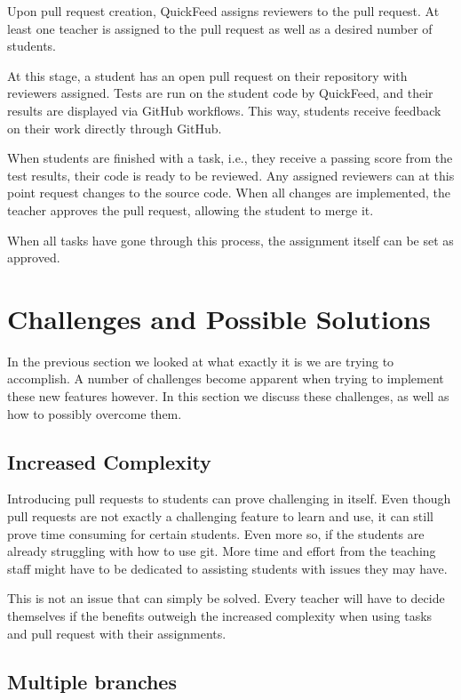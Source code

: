 Upon pull request creation, QuickFeed assigns reviewers to the pull request.
At least one teacher is assigned to the pull request as well as a desired number of students.

At this stage, a student has an open pull request on their repository with reviewers assigned.
Tests are run on the student code by QuickFeed, and their results are displayed via GitHub workflows.
This way, students receive feedback on their work directly through GitHub.

When students are finished with a task, i.e., they receive a passing score from the test results, their code is ready to be reviewed.
Any assigned reviewers can at this point request changes to the source code.
When all changes are implemented, the teacher approves the pull request, allowing the student to merge it.

When all tasks have gone through this process, the assignment itself can be set as approved.

\section{Challenges and Possible Solutions}

In the previous section we looked at what exactly it is we are trying to accomplish. 
A number of challenges become apparent when trying to implement these new features however.
In this section we discuss these challenges, as well as how to possibly overcome them.

\subsection{Increased Complexity}

Introducing pull requests to students can prove challenging in itself.
Even though pull requests are not exactly a challenging feature to learn and use, it can still prove time consuming for certain students.
Even more so, if the students are already struggling with how to use git.
More time and effort from the teaching staff might have to be dedicated to assisting students with issues they may have.

This is not an issue that can simply be solved.
Every teacher will have to decide themselves if the benefits outweigh the increased complexity when using tasks and pull request with their assignments.

\subsection{Multiple branches}


